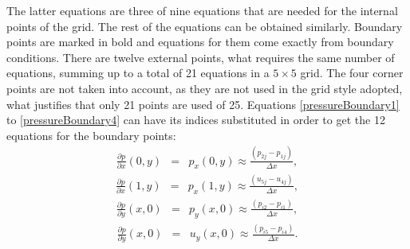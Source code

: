 \documentclass[journal]{IEEEtran}
\begin{document}
The latter equations are three of nine equations that are needed for the internal points of the grid. The rest of the equations can be obtained similarly. Boundary points are marked in bold and equations for them come exactly from boundary conditions. There are twelve external points, what requires the same number of equations, summing up to a total of 21 equations in a $5\times 5$ grid. The four corner points are not taken into account, as they are not used in the grid style adopted, what justifies that only 21 points are used of 25. Equations \ref{pressureBoundary1} to \ref{pressureBoundary4} can have its indices substituted in order to get the 12 equations for the boundary points: \begin{eqnarray}
\frac{\partial p}{\partial x}\left(0, y\right) &=& p_x\left(0, y\right)  \approx  \frac{(p_{2j} - p_{1j})}{\Delta x} \label{pressureBoundary1},\end{eqnarray} \begin{eqnarray}
\frac{\partial p}{\partial x}\left(1, y\right) &=& p_x\left(1, y\right)  \approx  \frac{(u_{5j} - u_{4j})}{\Delta x},\end{eqnarray} \begin{eqnarray}
\frac{\partial p}{\partial y}\left(x, 0\right) &=& p_y\left(x, 0\right)  \approx \frac{(p_{i2} - p_{i1})}{\Delta x},\end{eqnarray}\begin{eqnarray}
\frac{\partial p}{\partial y}\left(x, 0\right) &=& u_y\left(x, 0\right)  \approx  \frac{(p_{i5} - p_{i4})}{\Delta x}.\label{pressureBoundary4}
\end{eqnarray}
\end{document}
